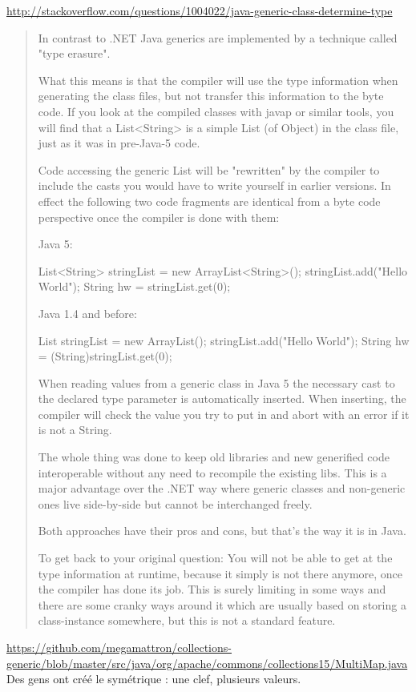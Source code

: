 \url{http://stackoverflow.com/questions/1004022/java-generic-class-determine-type}
\begin{quote}
In contrast to .NET Java generics are implemented by a technique called "type erasure".

What this means is that the compiler will use the type information when generating the class files, but not transfer this information to the byte code. If you look at the compiled classes with javap or similar tools, you will find that a List<String> is a simple List (of Object) in the class file, just as it was in pre-Java-5 code.

Code accessing the generic List will be "rewritten" by the compiler to include the casts you would have to write yourself in earlier versions. In effect the following two code fragments are identical from a byte code perspective once the compiler is done with them:

Java 5:

List<String> stringList = new ArrayList<String>();
stringList.add("Hello World");
String hw = stringList.get(0);

Java 1.4 and before:

List stringList = new ArrayList();
stringList.add("Hello World");
String hw = (String)stringList.get(0);

When reading values from a generic class in Java 5 the necessary cast to the declared type parameter is automatically inserted. When inserting, the compiler will check the value you try to put in and abort with an error if it is not a String.

The whole thing was done to keep old libraries and new generified code interoperable without any need to recompile the existing libs. This is a major advantage over the .NET way where generic classes and non-generic ones live side-by-side but cannot be interchanged freely.

Both approaches have their pros and cons, but that's the way it is in Java.

To get back to your original question: You will not be able to get at the type information at runtime, because it simply is not there anymore, once the compiler has done its job. This is surely limiting in some ways and there are some cranky ways around it which are usually based on storing a class-instance somewhere, but this is not a standard feature.\end{quote}

\url{https://github.com/megamattron/collections-generic/blob/master/src/java/org/apache/commons/collections15/MultiMap.java} Des gens ont créé le symétrique : une clef, plusieurs valeurs.


